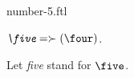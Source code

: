 \documentclass{stex}
\begin{document}
\begin{smodule}{number-5.ftl}



\begin{definition}[forthel,id=FiveDef]
  $\emph{\five} = \succ(\four)$.

  Let \emph{five} stand for $\five$.
\end{definition}

\end{smodule}
\end{document}
